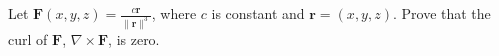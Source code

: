 \begin{problem}
Let $\mathbf{F}(x,y,z) = \frac{c\mathbf{r}}{\|\mathbf{r}\|^3}$, where $c$ is constant and $\mathbf{r} = (x,y,z)$. Prove that the curl of $\mathbf{F}$, $\nabla\times\mathbf{F}$, is zero.
\end{problem}